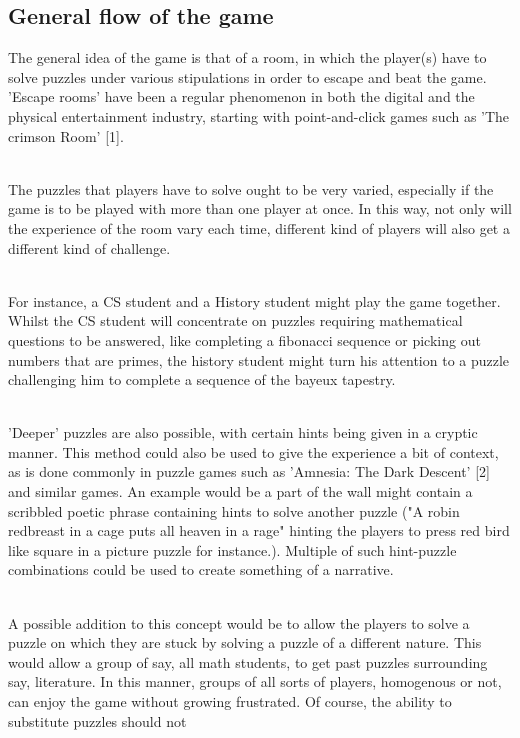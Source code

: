 \documentclass[11pt]{article}
\begin{document}
\subsection*{General flow of the game}
The general idea of the game is that of a room, in which the player(s) have to solve puzzles under various stipulations in order to escape and beat the game. 'Escape rooms' have been a regular phenomenon in both the digital and the physical entertainment industry, starting with point-and-click games such as 'The crimson Room' [1].


~\\
The puzzles that players have to solve ought to be very varied, especially if the game is to be played with more than one player at once. In this way, not only will the experience of the room vary each time, different kind of players will also get a different kind of challenge. 

~\\
For instance, a CS student and a History student might play the game together. Whilst the CS student will concentrate on puzzles requiring mathematical questions to be answered, like completing a fibonacci sequence or picking out numbers that are primes, the history student might turn his attention to a puzzle challenging him to complete a sequence of the bayeux tapestry.

~\\
 'Deeper' puzzles are also possible, with certain hints being given in a cryptic manner. This method could also be used to give the experience a bit of context, as is done commonly in puzzle games such as 'Amnesia: The Dark Descent' [2] and similar games.  An example would be a part of the wall might contain a scribbled poetic phrase containing hints to solve another puzzle ("A robin redbreast in a cage puts all heaven in a rage" hinting the players to press red bird like square in a picture puzzle for instance.). Multiple of such hint-puzzle combinations could be used to create something of a narrative. 

~\\
A possible addition to this concept would be to allow the players to solve a puzzle on which they are stuck by solving a puzzle of a different nature. This would allow a group of say, all math students, to get past puzzles surrounding say, literature. In this manner, groups of all sorts of players, homogenous or not, can enjoy the game without growing frustrated. Of course, the ability to substitute puzzles should not 
\end{document}
